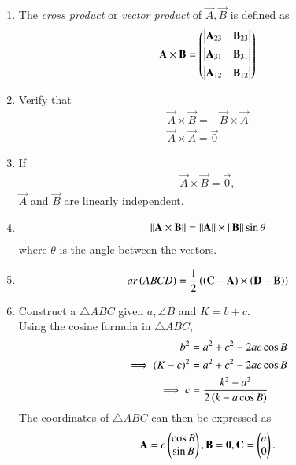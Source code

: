 \begin{enumerate}[label=\thesection.\arabic*.,ref=\thesection.\theenumi]
\item The {\em cross product} or {\em vector product} of $\vec{A}, \vec{B}$ is defined as
\begin{align}
  \label{eq:cross3d}
	\mathbf{A} \times \mathbf{B} 
	 = \begin{pmatrix} \begin{vmatrix}\mathbf{A}_{23} & \mathbf{B}_{23}\end{vmatrix} \\[1ex] \begin{vmatrix}\mathbf{A}_{31} & \mathbf{B}_{31}\end{vmatrix} \\[1ex] \begin{vmatrix}\mathbf{A}_{12}  & \mathbf{B}_{12}\end{vmatrix}\end{pmatrix}
\end{align}
\item Verify that
\begin{align}
  \label{eq:cross3d-commute}
  \vec{A} \times \vec{B} = -  \vec{B} \times \vec{A} 
  \\
  \label{eq:cross3d-same}
  \vec{A} \times \vec{A} = \vec{0}
\end{align}
\item If 
		\label{prop:lin-dep-cross}
\begin{align}
  \vec{A} \times \vec{B} = \vec{0},
\end{align}
  $\vec{A}$ and $ \vec{B} $ are linearly independent.
  \item 
\begin{align}
	\label{eq:cross-sin}
	\left\lVert \mathbf{A} \times \mathbf{B} \right\rVert
	=
	\left\lVert\mathbf{A}\right\rVert \times 	\left\lVert\mathbf{B}\right\rVert \sin \theta
\end{align}
where $\theta$ is the angle between the vectors.
\item 
\begin{align}
	ar\left(ABCD\right) = 
         \frac{1}{2}\left(\left(\mathbf{C}-\mathbf{A}\right)\times\left(\mathbf{D}-\mathbf{B}\right)\right) \\
        \label{eq:11/10/1/1area-diag} 
\end{align}
\item Construct a $\triangle ABC$ given $a, \angle B$ and $K = b+c$.
		\label{prob:9/11/2/1}
	\\
	\solution 
	Using the cosine formula in  $\triangle ABC$,
\begin{align}
	{b}^2&= {a}^2 + {c}^2 - 2ac\cos{B}
\\
\implies	(K-c)^2 &= {a}^2 + c^2- 2  a  c\cos{B}
\\
\implies
	c &=
	\frac{k^2-a^2}{2\left(k- a  \cos{B}\right)}
		\label{eq:9/11/2/1}
\end{align}
The coordinates of $\triangle ABC$ can then be expressed as
\begin{align}
		\label{eq:9/11/2/1-final}
	\mathbf{A}=c\begin{pmatrix}\cos B \\ \sin B\end{pmatrix},
	\mathbf{B} = \mathbf{0},
	\mathbf{C} =\begin{pmatrix}a \\ 0\end{pmatrix}.
\end{align}
\end{enumerate}
